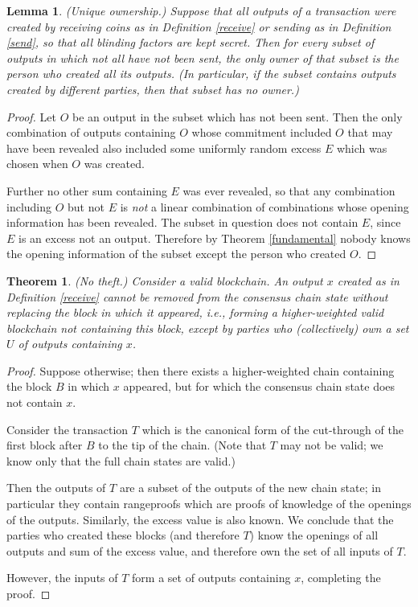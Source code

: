 \documentclass[letterpaper]{article}
\newtheorem{lmma}{Lemma}
\newtheorem{thrm}{Theorem}
\begin{document}
\begin{lmma} (Unique ownership.) Suppose that all outputs of a transaction
were created by receiving coins as in Definition \ref{receive} or sending
as in Definition \ref{send}, so that all blinding factors are kept secret.
Then for every subset of outputs in which
not all have not been sent, the only owner of that subset is the person
who created all its outputs. (In particular, if the subset contains outputs
created by different parties, then that subset has no owner.)
\label{unique}
\end{lmma}
\begin{proof} Let $O$ be an output in the subset which has not been sent.
Then the only combination of outputs containing $O$ whose commitment included
$O$ that may have been revealed also included some uniformly random excess
$E$ which was chosen when $O$ was created.

Further no other sum containing $E$ was ever revealed, so that any combination
including $O$ but not $E$ is \emph{not} a linear combination of combinations
whose opening information has been revealed. The subset in question does not
contain $E$, since $E$ is an excess not an output. Therefore by Theorem
\ref{fundamental} nobody knows the opening information of the subset except
the person who created $O$.
\end{proof}

\begin{thrm} (No theft.) Consider a valid blockchain. An output $x$
created as in Definition \ref{receive} cannot be removed from the
consensus chain state without replacing the block in which it appeared,
\emph{i.e.}, forming a higher-weighted valid blockchain not containing
this block, except by parties who (collectively) own a set $U$ of
outputs containing $x$.
\end{thrm}
\begin{proof} Suppose otherwise; then there exists a higher-weighted
chain containing the block $B$ in which $x$ appeared, but for which
the consensus chain state does not contain $x$.

Consider the transaction $T$ which is the canonical form of the
cut-through of the first block after $B$ to the tip of the chain.
(Note that $T$ may not be valid; we know only that the full chain
states are valid.)

Then the outputs of $T$ are a subset of the outputs of the new
chain state; in particular they contain rangeproofs which are
proofs of knowledge of the openings of the outputs. Similarly, the
excess value is also known. We conclude that the parties who created
these blocks (and therefore $T$) know the openings of all outputs and
sum of the excess value, and therefore own the set of all inputs of $T$.

However, the inputs of $T$ form a set of outputs containing $x$,
completing the proof.
\end{proof}
\end{document}
